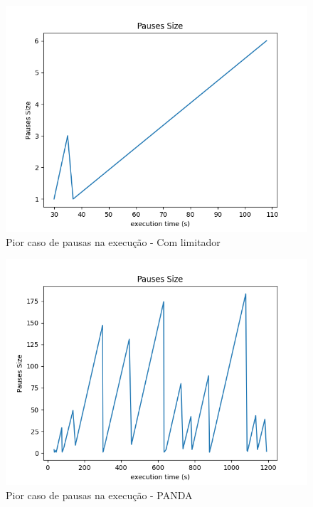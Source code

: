 \documentclass[10pt,twocolumn,letterpaper]{article}
\begin{document}
\begin{figure}
	\centering
	\includegraphics[width=\linewidth]{playback_pauses.png}
	\caption{Pior caso de pausas na execução - Com limitador}
	\label{fig:5}
\end{figure}
\begin{figure}
	\centering
	\includegraphics[width=\linewidth]{playback_pauses_25.png}
	\caption{Pior caso de pausas na execução - PANDA}
	\label{fig:6}
\end{figure}
\end{document}
